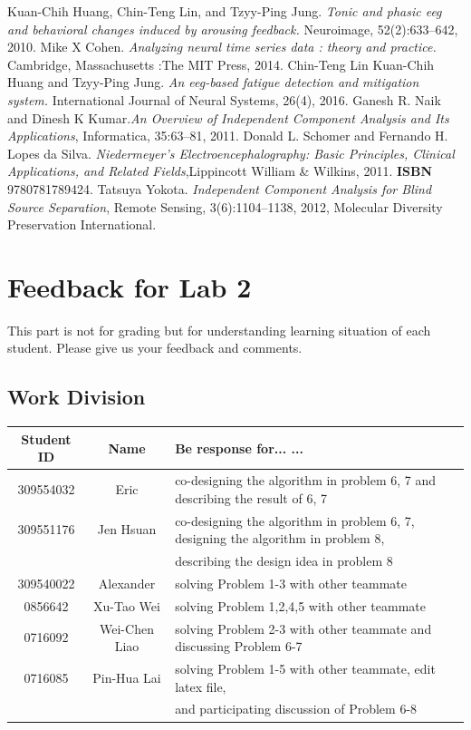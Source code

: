 \documentclass[a4 paper]{article}
\begin{document}
\begin{thebibliography}{6}
Kuan-Chih Huang, Chin-Teng Lin, and Tzyy-Ping Jung. \textit{Tonic and phasic eeg and behavioral changes induced by arousing feedback.} Neuroimage, 52(2):633–642, 2010.
Mike X Cohen. \textit{Analyzing neural time series data : theory and practice.} Cambridge, Massachusetts :The MIT Press, 2014.
\bibitem{}
Chin-Teng Lin Kuan-Chih Huang and Tzyy-Ping Jung. \textit{An eeg-based fatigue detection and mitigation system.} International Journal of Neural Systems, 26(4), 2016.
Ganesh R. Naik and Dinesh K Kumar.\textit{An Overview of Independent Component Analysis and Its Applications}, Informatica, 35:63--81, 2011.
Donald L. Schomer and Fernando H. Lopes da Silva.
\textit{Niedermeyer's Electroencephalography: Basic Principles, Clinical Applications, and Related Fields},Lippincott William \& Wilkins, 2011. \textbf{ISBN} 9780781789424.
Tatsuya Yokota. \textit{Independent Component Analysis for Blind Source Separation}, Remote Sensing, 3(6):1104--1138, 2012, Molecular Diversity Preservation International.
\end{thebibliography}
\newpage
\section{Feedback for Lab 2}
This part is not for grading but for understanding learning situation of each student. Please give us your feedback and comments.
\subsection{Work Division}
\begin{center}
    \begin{tabular}{||c|c|l||}
    \hline
    Student ID & Name & Be response for... ... \\\hline
    309554032 & Eric & co-designing the algorithm in problem 6, 7 and describing the result of 6, 7\\\hline
    309551176 & Jen Hsuan & co-designing the algorithm in problem 6, 7, designing the algorithm in problem 8, \\\hline
     &  & \hspace*{0.5cm}describing the design idea in problem 8\\\hline
    309540022 & Alexander & solving Problem 1-3 with other teammate \\\hline
    0856642 & Xu-Tao Wei &  solving Problem 1,2,4,5 with other teammate\\\hline
    0716092 & Wei-Chen Liao & solving Problem 2-3 with other teammate and discussing Problem 6-7\\\hline
    0716085 & Pin-Hua Lai & solving Problem 1-5 with other teammate, edit latex file, \\\hline
     &  & \hspace*{0.5cm}and participating discussion of Problem 6-8\\\hline
\end{tabular}
\end{center}
\end{document}
